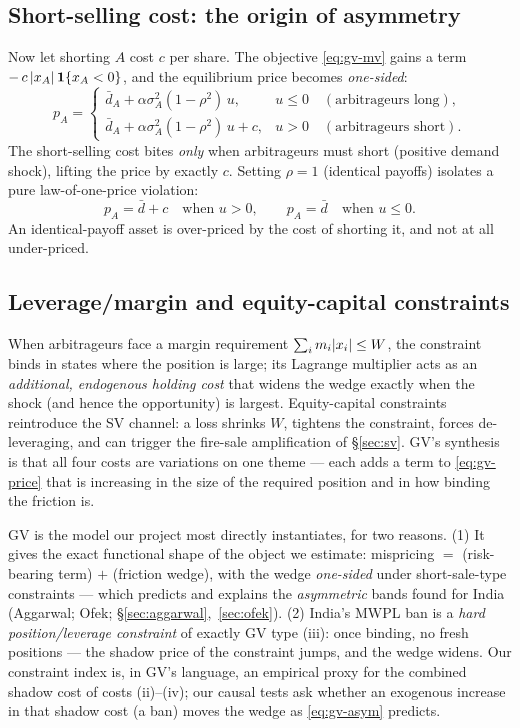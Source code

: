 \subsection*{Short-selling cost: the origin of asymmetry}
Now let shorting $A$ cost $c$ per share. The objective \eqref{eq:gv-mv} gains a term $-\,c\,\lvert x_A\rvert\,\mathbf{1}\{x_A<0\}$, and the equilibrium price becomes \emph{one-sided}:
\begin{equation}
p_A = \begin{cases} \bar d_A + \alpha\sigma_A^2(1-\rho^2)\,u, & u \le 0 \quad(\text{arbitrageurs long}),\\[4pt] \bar d_A + \alpha\sigma_A^2(1-\rho^2)\,u + c, & u > 0 \quad(\text{arbitrageurs short}). \end{cases} \label{eq:gv-asym}
\end{equation}
The short-selling cost bites \emph{only} when arbitrageurs must short (positive demand shock), lifting the price by exactly $c$. Setting $\rho=1$ (identical payoffs) isolates a pure law-of-one-price violation:
\begin{equation}
p_A = \bar d + c \quad\text{when } u>0, \qquad p_A=\bar d \quad\text{when } u\le 0.
\end{equation}
An identical-payoff asset is over-priced by the cost of shorting it, and not at all under-priced.

\subsection*{Leverage/margin and equity-capital constraints}
When arbitrageurs face a margin requirement $\sum_i m_i\lvert x_i\rvert\le W$, the constraint binds in states where the position is large; its Lagrange multiplier acts as an \emph{additional, endogenous holding cost} that widens the wedge exactly when the shock (and hence the opportunity) is largest. Equity-capital constraints reintroduce the SV channel: a loss shrinks $W$, tightens the constraint, forces de-leveraging, and can trigger the fire-sale amplification of \S\ref{sec:sv}. GV's synthesis is that all four costs are variations on one theme --- each adds a term to \eqref{eq:gv-price} that is increasing in the size of the required position and in how binding the friction is.

\begin{takeaway}
GV is the model our project most directly instantiates, for two reasons. (1) It gives the exact functional shape of the object we estimate: mispricing $=$ (risk-bearing term) $+$ (friction wedge), with the wedge \emph{one-sided} under short-sale-type constraints --- which predicts and explains the \emph{asymmetric} bands found for India (Aggarwal; Ofek; \S\ref{sec:aggarwal},~\ref{sec:ofek}). (2) India's MWPL ban is a \emph{hard position/leverage constraint} of exactly GV type (iii): once binding, no fresh positions --- the shadow price of the constraint jumps, and the wedge widens. Our constraint index is, in GV's language, an empirical proxy for the combined shadow cost of costs (ii)--(iv); our causal tests ask whether an exogenous increase in that shadow cost (a ban) moves the wedge as \eqref{eq:gv-asym} predicts.
\end{takeaway}

